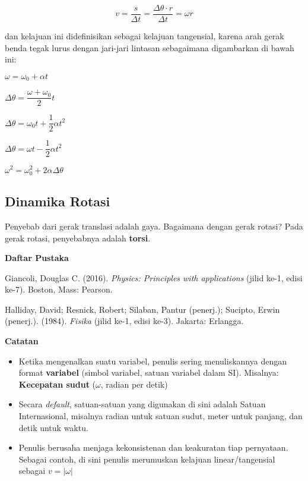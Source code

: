 \documentclass[12pt, a4paper]{article}\usepackage[utf8]{inputenc}
\theoremstyle{definition}
\theoremstyle{definition}
\begin{document}
\vspace{-.5em}
{
	\large \boldmath
	\begin{equation}
		v = \dfrac{s}{\Delta t} = \dfrac{\Delta \theta \cdot r}{\Delta t} = \omega r \tag{A.4}
	\end{equation}
}

dan kelajuan ini didefinisikan sebagai kelajuan tangensial, karena arah gerak benda tegak lurus dengan jari-jari lintasan sebagaimana digambarkan di bawah ini:

{
\large \boldmath$\omega = \omega_0 + \alpha t$
}

{
\large \boldmath $\Delta \theta = \dfrac{\omega + \omega_0}{2} t$
}

{
\large \boldmath$\Delta \theta = \omega_0 t + \dfrac{1}{2}\alpha t^2$
}

{
\large \boldmath$\Delta \theta = \omega t - \dfrac{1}{2}\alpha t^2$
}

{
	\large \boldmath$\omega^2 = \omega_0^2 + 2\alpha \Delta \theta$
}

\subsection{Dinamika Rotasi}
Penyebab dari gerak translasi adalah gaya. Bagaimana dengan gerak rotasi? Pada gerak rotasi, penyebabnya adalah \textbf{torsi}. 

\pagebreak
{\centering \Large \textbf{Daftar Pustaka} \par}
\vspace{5mm}
Giancoli, Douglas C. (2016). \emph{Physics: Principles with applications} (jilid ke-1, edisi ke-7). Boston, Mass: Pearson.
\par Halliday, David; Resnick, Robert; Silaban, Pantur (penerj.); Sucipto, Erwin (penerj.). (1984). \emph{Fisika} (jilid ke-1, edisi ke-3). Jakarta: Erlangga.

\vspace{3em}
{\centering \Large \textbf{Catatan} \par}
\begin{itemize}
	\item Ketika mengenalkan suatu variabel, penulis sering menuliskannya dengan format \textbf{variabel} (simbol variabel, satuan variabel dalam SI). Misalnya: \textbf{Kecepatan sudut} ($\omega$, radian per detik)
	\item Secara \emph{default}, satuan-satuan yang digunakan di sini adalah Satuan Internasional, misalnya radian untuk satuan sudut, meter untuk panjang, dan detik untuk waktu.
	\item Penulis berusaha menjaga kekonsistenan dan keakuratan tiap pernyataan. Sebagai contoh, di sini penulis merumuskan kelajuan linear/tangensial sebagai $v = \left|{\omega} \right|  $
\end{itemize}
\end{document}
